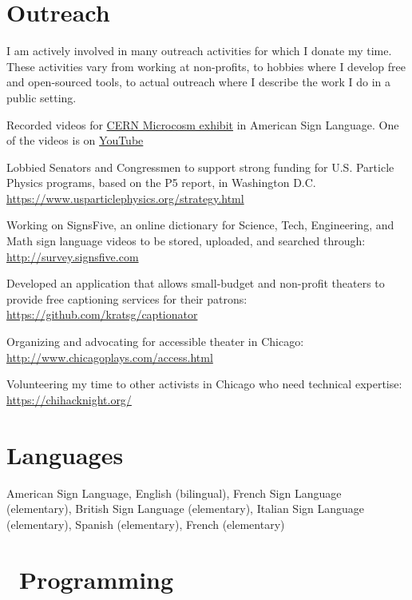 \documentclass[margin,line]{resume}
\let\origsection\section%
\let\section\subsection%
\let\section\origsection%
\begin{document}
\begin{resume}
\section{\mysidestyle Outreach}
I am actively involved in many outreach activities for which I donate my time. These activities vary from working at non-profits, to hobbies where I develop free and open-sourced tools, to actual outreach where I describe the work I do in a public setting.
\begin{list2}
\item Recorded videos for \href{https://microcosm.web.cern.ch/en}{CERN Microcosm exhibit} in American Sign Language. One of the videos is on \href{https://www.youtube.com/watch?v=BaGjAruqFec}{YouTube}
  \item Lobbied Senators and Congressmen to support strong funding for U.S. Particle Physics programs, based on the P5 report, in Washington D.C. \url{https://www.usparticlephysics.org/strategy.html}
  \item Working on SignsFive, an online dictionary for Science, Tech, Engineering, and Math sign language videos to be stored, uploaded, and searched through: \url{http://survey.signsfive.com}
  \item Developed an application that allows small-budget and non-profit theaters to provide free captioning services for their patrons: \url{https://github.com/kratsg/captionator}
  \item Organizing and advocating for accessible theater in Chicago: \url{http://www.chicagoplays.com/access.html}
  \item Volunteering my time to other activists in Chicago who need technical expertise: \url{https://chihacknight.org/}
\end{list2}

\section{\mysidestyle Languages}

American Sign Language, English (bilingual), French Sign Language (elementary), British Sign Language (elementary), Italian Sign Language (elementary), Spanish (elementary), French (elementary)

\section{\mysidestyle {}~Programming}


\end{resume}
\end{document}
